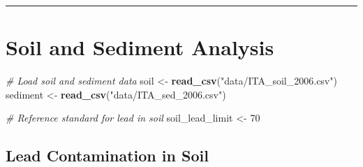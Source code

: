 \documentclass[
]{article}
\newenvironment{Shaded}{\begin{snugshade}}{\end{snugshade}}
\newcommand{\CommentTok}[1]{\textcolor[rgb]{0.56,0.35,0.01}{\textit{#1}}}
\newcommand{\DecValTok}[1]{\textcolor[rgb]{0.00,0.00,0.81}{#1}}
\newcommand{\FunctionTok}[1]{\textcolor[rgb]{0.13,0.29,0.53}{\textbf{#1}}}
\newcommand{\NormalTok}[1]{#1}
\newcommand{\OtherTok}[1]{\textcolor[rgb]{0.56,0.35,0.01}{#1}}
\newcommand{\StringTok}[1]{\textcolor[rgb]{0.31,0.60,0.02}{#1}}
\begin{document}
\begin{center}\rule{0.5\linewidth}{0.5pt}\end{center}

\section{Soil and Sediment Analysis}\label{soil-and-sediment-analysis}

\begin{Shaded}
\begin{Highlighting}[]
\CommentTok{\# Load soil and sediment data}
\NormalTok{soil }\OtherTok{\textless{}{-}} \FunctionTok{read\_csv}\NormalTok{(}\StringTok{"data/ITA\_soil\_2006.csv"}\NormalTok{)}
\NormalTok{sediment }\OtherTok{\textless{}{-}} \FunctionTok{read\_csv}\NormalTok{(}\StringTok{"data/ITA\_sed\_2006.csv"}\NormalTok{)}

\CommentTok{\# Reference standard for lead in soil}
\NormalTok{soil\_lead\_limit }\OtherTok{\textless{}{-}} \DecValTok{70}
\end{Highlighting}
\end{Shaded}

\subsection{Lead Contamination in
Soil}\label{lead-contamination-in-soil}
\end{document}
